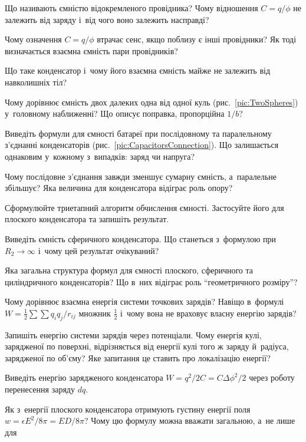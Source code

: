 \begin{Questions}
\begin{quizlist}
	\item Що називають ємністю відокремленого провідника? Чому відношення $C = q/\phi$ не
	  залежить від заряду і~від чого воно залежить насправді?
	\item Чому означення $C = q/\phi$ втрачає сенс, якщо поблизу є інші провідники? Як
	  тоді визначається взаємна ємність пари провідників?
	\item Що таке конденсатор і~чому його взаємна ємність майже не залежить від навколишніх
	  тіл?
	\item Чому дорівнює ємність двох далеких одна від одної куль
	  (рис.~\ref{pic:TwoSpheres}) у~головному наближенні? Що описує поправка, пропорційна
	  $1/b$?
	\item Виведіть формули для ємності батареї при послідовному та паралельному з'єднанні
	  конденсаторів (рис.~\ref{pic:CapacitorsConnection}). Що залишається однаковим
	  у~кожному з~випадків: заряд чи напруга?
	\item Чому послідовне з'єднання завжди зменшує сумарну ємність, а~паралельне збільшує?
	  Яка величина для конденсатора відіграє роль опору?
	\item Сформулюйте триетапний алгоритм обчислення ємності. Застосуйте його для плоского
	  конденсатора та запишіть результат.
	\item Виведіть ємність сферичного конденсатора. Що станеться з~формулою при
	  $R_2\to\infty$ і~чому цей результат очікуваний?
	\item Яка загальна структура формул для ємності плоского, сферичного та циліндричного
	  конденсаторів? Що в~них відіграє роль \enquote{геометричного розміру}?
	\item Чому дорівнює взаємна енергія системи точкових зарядів? Навіщо в~формулі $W =
	  \tfrac12\sum\sum q_iq_j/r_{ij}$ множник $\tfrac12$ і~чому вона не враховує власну
	  енергію зарядів?
	\item Запишіть енергію системи зарядів через потенціали. Чому енергія кулі, зарядженої
	  по поверхні, відрізняється від енергії кулі того ж заряду й~радіуса, зарядженої по
	  об'єму? Яке запитання це ставить про локалізацію енергії?
	\item Виведіть енергію зарядженого конденсатора $W = q^2/2C = C\Delta\phi^2/2$ через
	  роботу перенесення заряду $dq$.
	\item Як з~енергії плоского конденсатора отримують густину енергії поля $w = \epsilon
	  E^2/8\pi = ED/8\pi$? Чому цю формулу можна вважати загальною, а~не лише для

\end{quizlist}
\end{Questions}
